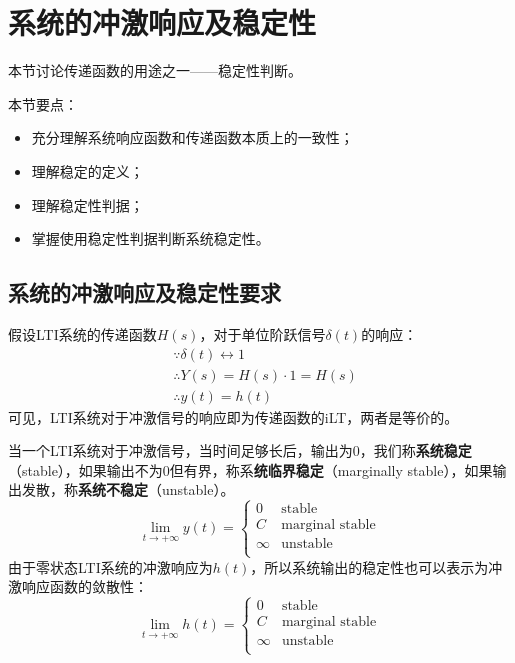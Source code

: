 \section{系统的冲激响应及稳定性}

本节讨论传递函数的用途之一——稳定性判断。

本节要点：
\begin{itemize}
    \item 充分理解系统响应函数和传递函数本质上的一致性；
    \item 理解稳定的定义；
    \item 理解稳定性判据；
    \item 掌握使用稳定性判据判断系统稳定性。
\end{itemize}

\subsection{系统的冲激响应及稳定性要求}

假设LTI系统的传递函数$H\left( s \right) $，对于单位阶跃信号$\delta \left( t \right) $的响应：
\begin{align*}
&\because \delta \left( t \right) \leftrightarrow 1 \\
&\therefore Y\left( s \right) =H\left( s \right) \cdot 1=H\left( s \right) \\
&\therefore y\left( t \right) =h\left( t \right)
\end{align*}
可见，LTI系统对于冲激信号的响应即为传递函数的iLT，两者是等价的。

\begin{definition}[系统的稳定性]
当一个LTI系统对于冲激信号，当时间足够长后，输出为0，我们称{\bf 系统稳定}（stable），如果输出不为0但有界，称系{\bf 统临界稳定}（marginally stable），如果输出发散，称{\bf 系统不稳定}（unstable）。
\[
\underset{t\rightarrow +\infty}\lim y\left( t \right) =\begin{cases}
	0 &\mathrm{stable}\\
	C &\mathrm{marginal} \,\, \mathrm{stable}\\
	\infty &\mathrm{unstable}\\
\end{cases}
\]
由于零状态LTI系统的冲激响应为$h\left( t \right) $，所以系统输出的稳定性也可以表示为冲激响应函数的敛散性：
\[
\underset{t\rightarrow +\infty}\lim h\left( t \right) =\begin{cases}
	0 &\mathrm{stable}\\
	C &\mathrm{marginal} \,\, \mathrm{stable}\\
	\infty &\mathrm{unstable}\\
\end{cases}
\]
\end{definition}

